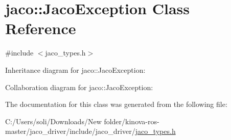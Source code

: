\hypertarget{classjaco_1_1_jaco_exception}{}\section{jaco\+:\+:Jaco\+Exception Class Reference}
\label{classjaco_1_1_jaco_exception}


{\ttfamily \#include $<$jaco\+\_\+types.\+h$>$}



Inheritance diagram for jaco\+:\+:Jaco\+Exception\+:


Collaboration diagram for jaco\+:\+:Jaco\+Exception\+:


The documentation for this class was generated from the following file\+:\begin{DoxyCompactItemize}
\item 
C\+:/\+Users/soli/\+Downloads/\+New folder/kinova-\/ros-\/master/jaco\+\_\+driver/include/jaco\+\_\+driver/\hyperlink{jaco__types_8h}{jaco\+\_\+types.\+h}\end{DoxyCompactItemize}
